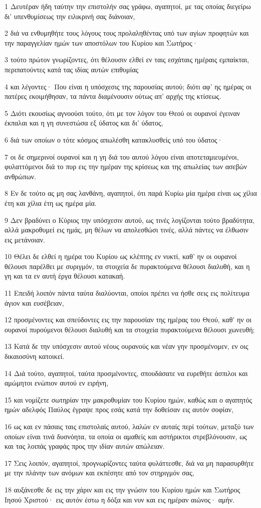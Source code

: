 \par 1 Δευτέραν ήδη ταύτην την επιστολήν σας γράφω, αγαπητοί, με τας οποίας διεγείρω δι' υπενθυμίσεως την ειλικρινή σας διάνοιαν,
\par 2 διά να ενθυμηθήτε τους λόγους τους προλαληθέντας υπό των αγίων προφητών και την παραγγελίαν ημών των αποστόλων του Κυρίου και Σωτήρος·
\par 3 τούτο πρώτον γνωρίζοντες, ότι θέλουσιν ελθεί εν ταις εσχάταις ημέραις εμπαίκται, περιπατούντες κατά τας ιδίας αυτών επιθυμίας
\par 4 και λέγοντες· Που είναι η υπόσχεσις της παρουσίας αυτού; διότι αφ' ης ημέρας οι πατέρες εκοιμήθησαν, τα πάντα διαμένουσιν ούτως απ' αρχής της κτίσεως.
\par 5 Διότι εκουσίως αγνοούσι τούτο, ότι με τον λόγον του Θεού οι ουρανοί έγειναν έκπαλαι και η γη συνεστώσα εξ ύδατος και δι' ύδατος,
\par 6 διά των οποίων ο τότε κόσμος απωλέσθη κατακλυσθείς υπό του ύδατος·
\par 7 οι δε σημερινοί ουρανοί και η γη διά του αυτού λόγου είναι αποτεταμιευμένοι, φυλαττόμενοι διά το πυρ εις την ημέραν της κρίσεως και της απωλείας των ασεβών ανθρώπων.
\par 8 Εν δε τούτο ας μη σας λανθάνη, αγαπητοί, ότι παρά Κυρίω μία ημέρα είναι ως χίλια έτη και χίλια έτη ως ημέρα μία.
\par 9 Δεν βραδύνει ο Κύριος την υπόσχεσιν αυτού, ως τινές λογίζονται τούτο βραδύτητα, αλλά μακροθυμεί εις ημάς, μη θέλων να απολεσθώσι τινές, αλλά πάντες να έλθωσιν εις μετάνοιαν.
\par 10 Θέλει δε ελθεί η ημέρα του Κυρίου ως κλέπτης εν νυκτί, καθ' ην οι ουρανοί θέλουσι παρέλθει με συριγμόν, τα στοιχεία δε πυρακτούμενα θέλουσι διαλυθή, και η γη και τα εν αυτή έργα θέλουσι κατακαή.
\par 11 Επειδή λοιπόν πάντα ταύτα διαλύονται, οποίοι πρέπει να ήσθε σεις εις πολίτευμα άγιον και ευσέβειαν,
\par 12 προσμένοντες και σπεύδοντες εις την παρουσίαν της ημέρας του Θεού, καθ' ην οι ουρανοί πυρούμενοι θέλουσι διαλυθή και τα στοιχεία πυρακτούμενα θέλουσι χωνευθή;
\par 13 Κατά δε την υπόσχεσιν αυτού νέους ουρανούς και νέαν γην προσμένομεν, εν οις δικαιοσύνη κατοικεί.
\par 14 Διά τούτο, αγαπητοί, ταύτα προσμένοντες, σπουδάσατε να ευρεθήτε άσπιλοι και αμώμητοι ενώπιον αυτού εν ειρήνη,
\par 15 και νομίζετε σωτηρίαν την μακροθυμίαν του Κυρίου ημών, καθώς και ο αγαπητός ημών αδελφός Παύλος έγραψε προς εσάς κατά την δοθείσαν εις αυτόν σοφίαν,
\par 16 ως και εν πάσαις ταις επιστολαίς αυτού, λαλών εν αυταίς περί τούτων, μεταξύ των οποίων είναι τινά δυσνόητα, τα οποία οι αμαθείς και αστήρικτοι στρεβλόνουσιν, ως και τας λοιπάς γραφάς προς την ιδίαν αυτών απώλειαν.
\par 17 Σεις λοιπόν, αγαπητοί, προγνωρίζοντες ταύτα φυλάττεσθε, διά να μη παρασυρθήτε με την πλάνην των ανόμων και εκπέσητε από τον στηριγμόν σας,
\par 18 αυξάνεσθε δε εις την χάριν και εις την γνώσιν του Κυρίου ημών και Σωτήρος Ιησού Χριστού· εις αυτόν έστω η δόξα και νυν και εις ημέραν αιώνος· αμήν.


